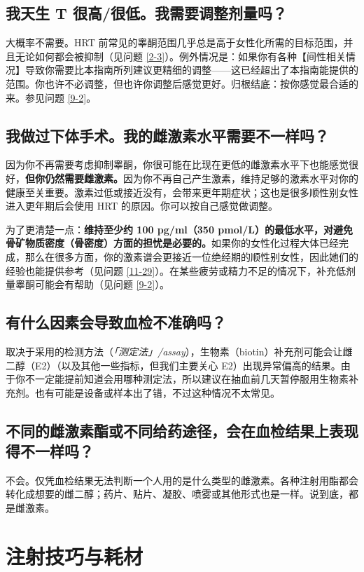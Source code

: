 \documentclass{article}
\begin{document}
\subsection{我天生 T 很高/很低。我需要调整剂量吗？}

大概率不需要。HRT 前常见的睾酮范围几乎总是高于女性化所需的目标范围，并且无论如何都会被抑制（见问题 \ref{2-3}）。例外情况是：如果你有各种【间性相关情况】导致你需要比本指南所列建议更精细的调整——这已经超出了本指南能提供的范围。你也许不必调整，但也许你调整后感觉更好。归根结底：按你感觉最合适的来。参见问题 \ref{9-2}。

\subsection{我做过下体手术。我的雌激素水平需要不一样吗？}

因为你不再需要考虑抑制睾酮，你很可能在比现在更低的雌激素水平下也能感觉很好，\textbf{但你仍然需要雌激素。}因为你不再自己产生激素，维持足够的激素水平对你的健康至关重要。激素过低或接近没有，会带来更年期症状；这也是很多顺性别女性进入更年期后会使用 HRT 的原因。你可以按自己感觉做调整。

为了更清楚一点：\textbf{维持至少约 100 pg/ml（350 pmol/L）的最低水平，对避免骨矿物质密度（骨密度）方面的担忧是必要的。}如果你的女性化过程大体已经完成，那么在很多方面，你的激素谱会更接近一位绝经期的顺性别女性，因此她们的经验也能提供参考（见问题 \ref{11-29}）。在某些疲劳或精力不足的情况下，补充低剂量睾酮可能会有帮助（见问题 \ref{9-2}）。

\subsection{有什么因素会导致血检不准确吗？}

取决于采用的检测方法（\textit{「测定法」/assay}），生物素（biotin）补充剂可能会让雌二醇（E2）（以及其他一些指标，但我们主要关心 E2）出现异常偏高的结果。由于你不一定能提前知道会用哪种测定法，所以建议在抽血前几天暂停服用生物素补充剂。也有可能是设备或样本出了错，不过这种情况不太常见。

\subsection{不同的雌激素酯或不同给药途径，会在血检结果上表现得不一样吗？}\label{4-16}

不会。仅凭血检结果无法判断一个人用的是什么类型的雌激素。各种注射用酯都会转化成想要的雌二醇；药片、贴片、凝胶、喷雾或其他形式也是一样。说到底，都是雌激素。
\section{注射技巧与耗材}\label{ts}
\end{document}
